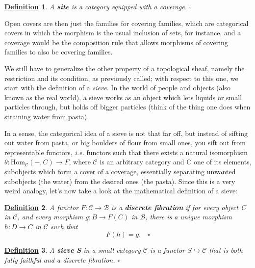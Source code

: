 \documentclass{article}
\newtheorem*{def*}{\underline{Definition}}
\begin{document}
\begin{def*}
	A \textbf{site} is a category equipped with a coverage. \(\square\)
\end{def*}

Open covers are then just the families for covering families, which are categorical covers in which the morphism is the usual inclusion of sets, for instance, and a coverage would be the composition rule that allows morphisms of covering families to also be covering families.

We still have to generalize the other property of a topological sheaf, namely the restriction and its condition, as previously called; with respect to this one, we start with the definition of a \textit{sieve}. In the world of people and objects (also known as the real world), a sieve works as an object which lets liquids or small particles through, but holds off bigger particles (think of the thing one does when straining water from pasta).

In a sense, the categorical idea of a sieve is not that far off, but instead of sifting out water from pasta, or big boulders of flour from small ones, you sift out from representable functors, \textit{i.e.} functors such that there exists a natural isomorphism \(\theta :\mathrm{Hom}_{\mathcal{C}}(-, C)\rightarrow F\), where \(\mathcal{C}\) is an arbitrary category and C one of its elements, subobjects which form a cover of a coverage, essentially separating unwanted subobjects (the water) from the desired ones (the pasta). Since this is a very weird analogy, let's now take a look at the mathematical definition of a sieve:

\begin{def*}
	A functor \(F:\mathcal{C}\rightarrow \mathcal{B}\) is a \textbf{discrete fibration} if for every object C in \(\mathcal{C}\), and every morphism \(g:B\rightarrow F(C)\) in \(\mathcal{B}\), there is a unique morphism \(h:D\rightarrow C\) in \(\mathcal{C}\) such that
	\[
		F(h) = g.\quad \square
	\]
\end{def*}

\begin{def*}
	A \textbf{sieve S} in a small category \(\mathcal{C}\) is a functor \(S\hookrightarrow \mathcal{C}\) that is both fully faithful and a discrete fibration. \(\square\)
\end{def*}
\end{document}
